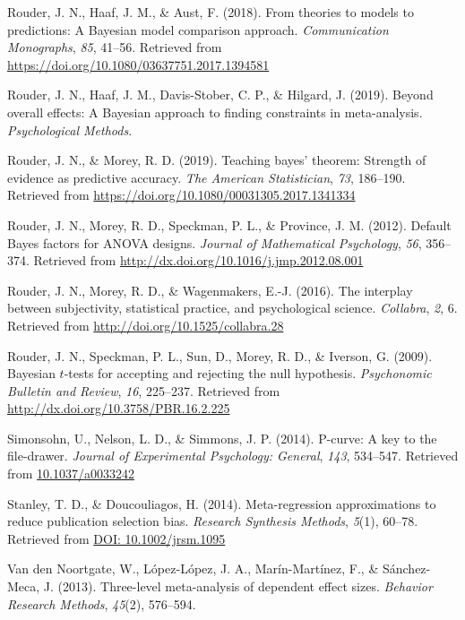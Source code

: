 \documentclass[english,,man]{apa6}
\begin{document}
\leavevmode\hypertarget{ref-Rouder:etal:2018}{}%
Rouder, J. N., Haaf, J. M., \& Aust, F. (2018). From theories to models to predictions: A Bayesian model comparison approach. \emph{Communication Monographs}, \emph{85}, 41--56. Retrieved from \url{https://doi.org/10.1080/03637751.2017.1394581}

\leavevmode\hypertarget{ref-Rouder:etal:2019b}{}%
Rouder, J. N., Haaf, J. M., Davis-Stober, C. P., \& Hilgard, J. (2019). Beyond overall effects: A Bayesian approach to finding constraints in meta-analysis. \emph{Psychological Methods}.

\leavevmode\hypertarget{ref-Rouder:Morey:2019}{}%
Rouder, J. N., \& Morey, R. D. (2019). Teaching bayes' theorem: Strength of evidence as predictive accuracy. \emph{The American Statistician}, \emph{73}, 186--190. Retrieved from \url{https://doi.org/10.1080/00031305.2017.1341334}

\leavevmode\hypertarget{ref-Rouder:etal:2012}{}%
Rouder, J. N., Morey, R. D., Speckman, P. L., \& Province, J. M. (2012). Default Bayes factors for ANOVA designs. \emph{Journal of Mathematical Psychology}, \emph{56}, 356--374. Retrieved from \url{http://dx.doi.org/10.1016/j.jmp.2012.08.001}

\leavevmode\hypertarget{ref-Rouder:etal:2016b}{}%
Rouder, J. N., Morey, R. D., \& Wagenmakers, E.-J. (2016). The interplay between subjectivity, statistical practice, and psychological science. \emph{Collabra}, \emph{2}, 6. Retrieved from \url{http://doi.org/10.1525/collabra.28}

\leavevmode\hypertarget{ref-Rouder:etal:2009a}{}%
Rouder, J. N., Speckman, P. L., Sun, D., Morey, R. D., \& Iverson, G. (2009). Bayesian \(t\)-tests for accepting and rejecting the null hypothesis. \emph{Psychonomic Bulletin and Review}, \emph{16}, 225--237. Retrieved from \url{http://dx.doi.org/10.3758/PBR.16.2.225}

\leavevmode\hypertarget{ref-Simonsohn:etal:2014}{}%
Simonsohn, U., Nelson, L. D., \& Simmons, J. P. (2014). P-curve: A key to the file-drawer. \emph{Journal of Experimental Psychology: General}, \emph{143}, 534--547. Retrieved from \url{10.1037/a0033242}

\leavevmode\hypertarget{ref-Stanley:Doucouliagos:2014}{}%
Stanley, T. D., \& Doucouliagos, H. (2014). Meta-regression approximations to reduce publication selection bias. \emph{Research Synthesis Methods}, \emph{5}(1), 60--78. Retrieved from \href{DOI:\%2010.1002/jrsm.1095}{DOI: 10.1002/jrsm.1095}

\leavevmode\hypertarget{ref-VandenNoortgate:etal:2013}{}%
Van den Noortgate, W., López-López, J. A., Marín-Martínez, F., \& Sánchez-Meca, J. (2013). Three-level meta-analysis of dependent effect sizes. \emph{Behavior Research Methods}, \emph{45}(2), 576--594.
\end{document}
